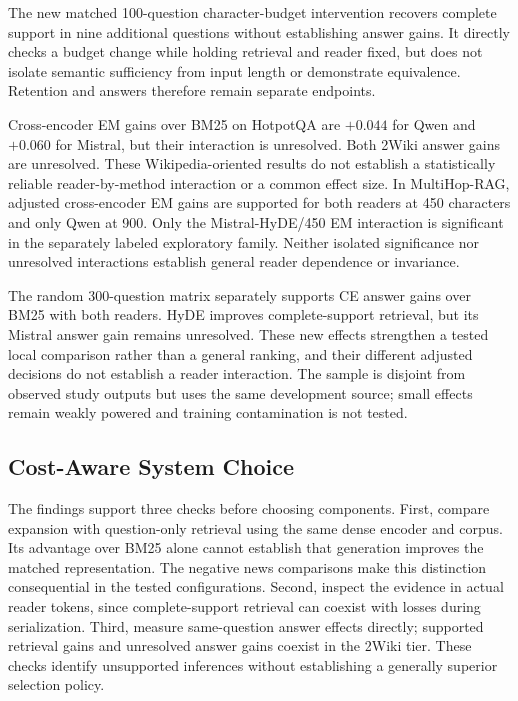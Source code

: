 The new matched 100-question character-budget intervention recovers complete support in nine additional questions without establishing answer gains. It directly checks a budget change while holding retrieval and reader fixed, but does not isolate semantic sufficiency from input length or demonstrate equivalence. Retention and answers therefore remain separate endpoints.

Cross-encoder EM gains over BM25 on HotpotQA are $+0.044$ for Qwen and $+0.060$ for Mistral, but their interaction is unresolved. Both 2Wiki answer gains are unresolved. These Wikipedia-oriented results do not establish a statistically reliable reader-by-method interaction or a common effect size. In MultiHop-RAG, adjusted cross-encoder EM gains are supported for both readers at 450 characters and only Qwen at 900. Only the Mistral-HyDE/450 EM interaction is significant in the separately labeled exploratory family. Neither isolated significance nor unresolved interactions establish general reader dependence or invariance.

The random 300-question matrix separately supports CE answer gains over BM25 with both readers. HyDE improves complete-support retrieval, but its Mistral answer gain remains unresolved. These new effects strengthen a tested local comparison rather than a general ranking, and their different adjusted decisions do not establish a reader interaction. The sample is disjoint from observed study outputs but uses the same development source; small effects remain weakly powered and training contamination is not tested.

\subsection{Cost-Aware System Choice}
\label{sec:system_design_implications}

The findings support three checks before choosing components. First, compare expansion with question-only retrieval using the same dense encoder and corpus. Its advantage over BM25 alone cannot establish that generation improves the matched representation. The negative news comparisons make this distinction consequential in the tested configurations. Second, inspect the evidence in actual reader tokens, since complete-support retrieval can coexist with losses during serialization. Third, measure same-question answer effects directly; supported retrieval gains and unresolved answer gains coexist in the 2Wiki tier. These checks identify unsupported inferences without establishing a generally superior selection policy.

